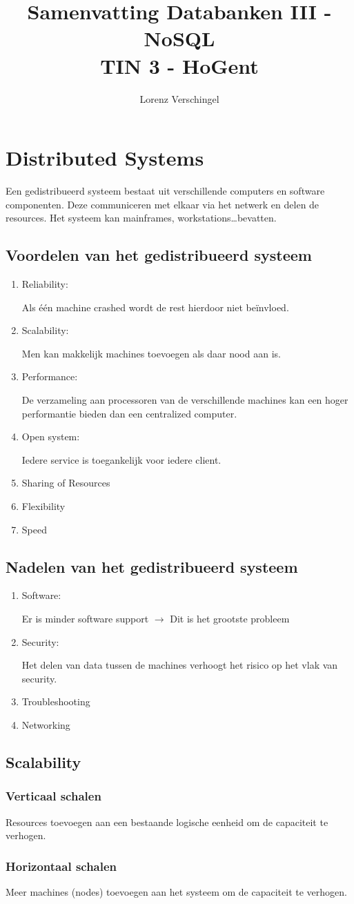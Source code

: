 \documentclass[a4paper,12pt]{article}
\title{Samenvatting Databanken III - NoSQL \\ \large TIN 3 - HoGent}
\author{Lorenz Verschingel}
\begin{document}
\maketitle
\section{Distributed Systems}
Een gedistribueerd systeem bestaat uit verschillende computers en software componenten.
Deze communiceren met elkaar via het netwerk en delen de resources.
Het systeem kan mainframes, workstations\ldots bevatten.

\subsection{Voordelen van het gedistribueerd systeem}
\begin{enumerate}
\item Reliability:

Als één machine crashed wordt de rest hierdoor niet beïnvloed.
\item Scalability:

Men kan makkelijk machines toevoegen als daar nood aan is.
\item Performance:

De verzameling aan processoren van de verschillende machines kan een hoger performantie bieden dan een centralized computer.
\item Open system:

Iedere service is toegankelijk voor iedere client.
\item Sharing of Resources
\item Flexibility
\item Speed
\end{enumerate}

\subsection{Nadelen van het gedistribueerd systeem}
\begin{enumerate}
\item Software:

Er is minder software support $\rightarrow$ Dit is het grootste probleem
\item Security:

Het delen van data tussen de machines verhoogt het risico op het vlak van security.
\item Troubleshooting
\item Networking
\end{enumerate}

\subsection{Scalability}
\subsubsection{Verticaal schalen}
Resources toevoegen aan een bestaande logische eenheid om de capaciteit te verhogen.
\subsubsection{Horizontaal schalen}
Meer machines (nodes) toevoegen aan het systeem om de capaciteit te verhogen.
\end{document}
